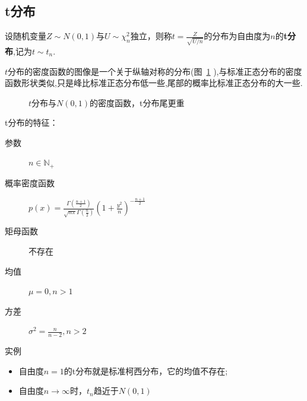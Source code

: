 \subsection{t分布}

\begin{definition}
    设随机变量$Z \sim N(0,1)$与$U \sim\chi^2_n$独立，则称$t=\frac{Z}{\sqrt{U/n}}$的分布为自由度为$n$的\textbf{t分布},记为$t \sim t_n$.
\end{definition}

$t$分布的密度函数的图像是一个关于纵轴对称的分布(图~\ref{fig:5.4.3} ),与标准正态分布的密度函数形状类似,只是峰比标准正态分布低一些,尾部的概率比标准正态分布的大一些.
\begin{figure}
    \centering
    \caption{$t$分布与$N(0,1)$的密度函数，t分布尾更重}\label{fig:5.4.3}
\end{figure}

t分布的特征：
\begin{description}
    \item[参数] $n \in \mathbb{N}_+$
    \item[概率密度函数] $p(x)=\frac{\Gamma \left( \frac{n+1}{2} \right)}{\sqrt{n\pi}\Gamma \left( \frac{n}{2} \right)}\left( 1+\frac{y^2}{n} \right) ^{-\frac{n+1}{2}}$
    \item[矩母函数] 不存在
    \item[均值] $\mu=0, n>1$
    \item[方差] $\sigma^2=\frac{n}{n-2}, n>2$
    \item[实例]
\end{description}

\begin{remark}
    \begin{itemize}
        \item 自由度$n=1$的t分布就是标准柯西分布，它的均值不存在;
        \item 自由度$n\to \infty$时，$t_n$趋近于$N(0,1)$
    \end{itemize}
\end{remark}

